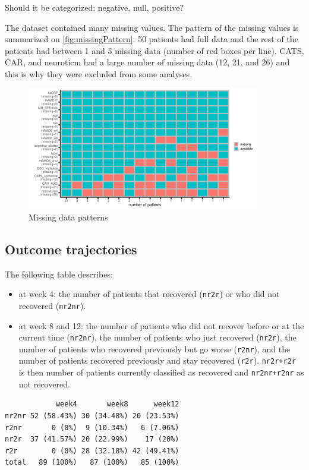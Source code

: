 \documentclass[12pt]{article}
\begin{document}
Should it be categorized: negative, null, positive?

\vfill

The dataset contained many missing values. The pattern of the missing
values is summarized on \autoref{fig:missingPattern}. 50 patients had
full data and the rest of the patients had between 1 and 5 missing
data (number of red boxes per line). CATS, CAR, and neuroticm had a
large number of missing data (12, 21, and 26) and this is why they
were excluded from some analyses.

\clearpage

\begin{figure}[!h]
\centering
\includegraphics[trim={0 0 0 0},width=0.9\textwidth]{./figures/gg-missingPattern.pdf}
\caption{\label{fig:missingPattern}Missing data patterns}
\end{figure}

\bigskip

\subsection{Outcome trajectories}
\label{sec:org8bfd5b4}

The following table describes:
\begin{itemize}
\item at week 4: the number of patients that recovered (\texttt{nr2r}) or who did
not recovered (\texttt{nr2nr}).
\item at week 8 and 12: the number of patients who did not recover before
or at the current time (\texttt{nr2nr}), the number of patients who just
recovered (\texttt{nr2r}), the number of patients who recovered previously
but go worse (\texttt{r2nr}), and the number of patients recovered
previously and stay recovered (\texttt{r2r}). \texttt{nr2r+r2r} is then number of
patients currently classified as recovered and \texttt{nr2nr+r2nr} as not
recovered.
\end{itemize}
\begin{verbatim}
            week4       week8      week12
nr2nr 52 (58.43%) 30 (34.48%) 20 (23.53%)
r2nr       0 (0%)  9 (10.34%)   6 (7.06%)
nr2r  37 (41.57%) 20 (22.99%)    17 (20%)
r2r        0 (0%) 28 (32.18%) 42 (49.41%)
total   89 (100%)   87 (100%)   85 (100%)
\end{verbatim}
\end{document}
